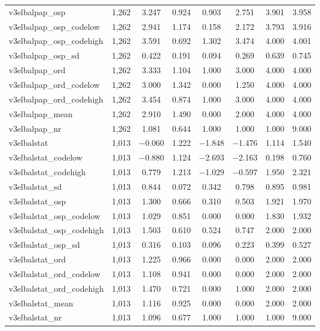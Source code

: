 \begin{table}[!htbp]
\begin{tabular}{@{\extracolsep{5pt}}lccccccc}
v3elbalpap\_osp & 1,262 & 3.247 & 0.924 & 0.903 & 2.751 & 3.901 & 3.958 \\ 
v3elbalpap\_osp\_codelow & 1,262 & 2.941 & 1.174 & 0.158 & 2.172 & 3.793 & 3.916 \\ 
v3elbalpap\_osp\_codehigh & 1,262 & 3.591 & 0.692 & 1.302 & 3.474 & 4.000 & 4.001 \\ 
v3elbalpap\_osp\_sd & 1,262 & 0.422 & 0.191 & 0.094 & 0.269 & 0.639 & 0.745 \\ 
v3elbalpap\_ord & 1,262 & 3.333 & 1.104 & 1.000 & 3.000 & 4.000 & 4.000 \\ 
v3elbalpap\_ord\_codelow & 1,262 & 3.000 & 1.342 & 0.000 & 1.250 & 4.000 & 4.000 \\ 
v3elbalpap\_ord\_codehigh & 1,262 & 3.454 & 0.874 & 1.000 & 3.000 & 4.000 & 4.000 \\ 
v3elbalpap\_mean & 1,262 & 2.910 & 1.490 & 0.000 & 2.000 & 4.000 & 4.000 \\ 
v3elbalpap\_nr & 1,262 & 1.081 & 0.644 & 1.000 & 1.000 & 1.000 & 9.000 \\ 
v3elbalstat & 1,013 & $-$0.060 & 1.222 & $-$1.848 & $-$1.476 & 1.114 & 1.540 \\ 
v3elbalstat\_codelow & 1,013 & $-$0.880 & 1.124 & $-$2.693 & $-$2.163 & 0.198 & 0.760 \\ 
v3elbalstat\_codehigh & 1,013 & 0.779 & 1.213 & $-$1.029 & $-$0.597 & 1.950 & 2.321 \\ 
v3elbalstat\_sd & 1,013 & 0.844 & 0.072 & 0.342 & 0.798 & 0.895 & 0.981 \\ 
v3elbalstat\_osp & 1,013 & 1.300 & 0.666 & 0.310 & 0.503 & 1.921 & 1.970 \\ 
v3elbalstat\_osp\_codelow & 1,013 & 1.029 & 0.851 & 0.000 & 0.000 & 1.830 & 1.932 \\ 
v3elbalstat\_osp\_codehigh & 1,013 & 1.503 & 0.610 & 0.524 & 0.747 & 2.000 & 2.000 \\ 
v3elbalstat\_osp\_sd & 1,013 & 0.316 & 0.103 & 0.096 & 0.223 & 0.399 & 0.527 \\ 
v3elbalstat\_ord & 1,013 & 1.225 & 0.966 & 0.000 & 0.000 & 2.000 & 2.000 \\ 
v3elbalstat\_ord\_codelow & 1,013 & 1.108 & 0.941 & 0.000 & 0.000 & 2.000 & 2.000 \\ 
v3elbalstat\_ord\_codehigh & 1,013 & 1.470 & 0.721 & 0.000 & 1.000 & 2.000 & 2.000 \\ 
v3elbalstat\_mean & 1,013 & 1.116 & 0.925 & 0.000 & 0.000 & 2.000 & 2.000 \\ 
v3elbalstat\_nr & 1,013 & 1.096 & 0.677 & 1.000 & 1.000 & 1.000 & 9.000 \\ 

\end{tabular}
\end{table}
